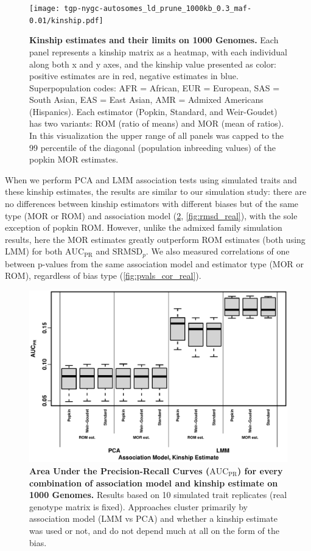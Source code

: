 \documentclass[11pt]{article}
\newcommand{\rmsd}{\text{SRMSD}_p}
\newcommand{\auc}{\text{AUC}_\text{PR}}
\begin{document}
\begin{figure}[bp!]
  \centering
  \texttt{[image: tgp-nygc-autosomes\_ld\_prune\_1000kb\_0.3\_maf-0.01/kinship.pdf]}
  \caption{
    {\bf Kinship estimates and their limits on 1000 Genomes.}
    Each panel represents a kinship matrix as a heatmap, with each individual along both x and y axes, and the kinship value presented as color: positive estimates are in red, negative estimates in blue.
    Superpopulation codes: AFR = African, EUR = European, SAS = South Asian, EAS = East Asian, AMR = Admixed Americans (Hispanics).
    Each estimator (Popkin, Standard, and Weir-Goudet) has two variants: ROM (ratio of means) and MOR (mean of ratios).
    In this visualization the upper range of all panels was capped to the 99 percentile of the diagonal (population inbreeding values) of the popkin MOR estimates.
  }
  \label{fig:kinship_real}
\end{figure}


When we perform PCA and LMM association tests using simulated traits and these kinship estimates, the results are similar to our simulation study: there are no differences between kinship estimators with different biases but of the same type (MOR or ROM) and association model (\cref{fig:auc_real}, \cref{fig:rmsd_real}), with the sole exception of popkin ROM.
However, unlike the admixed family simulation results, here the MOR estimates greatly outperform ROM estimates (both using LMM) for both $\auc$ and $\rmsd$.
We also measured correlations of one between p-values from the same association model and estimator type (MOR or ROM), regardless of bias type (\cref{fig:pvals_cor_real}).

\begin{figure}[bp!]
  \centering
  \includegraphics[width=\textwidth]{tgp-nygc-autosomes_ld_prune_1000kb_0.3_maf-0.01/auc.pdf}
  \caption{
    {\bf Area Under the Precision-Recall Curves ($\auc$) for every combination of association model and kinship estimate on 1000 Genomes.}
    Results based on 10 simulated trait replicates (real genotype matrix is fixed).
    Approaches cluster primarily by association model (LMM vs PCA) and whether a kinship estimate was used or not, and do not depend much at all on the form of the bias.
  }
  \label{fig:auc_real}
\end{figure}
\end{document}
